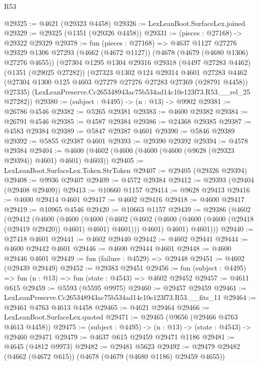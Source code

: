\begin{lexlean}{R53}
\begin{coremodule}
@29325 := @4621 (@29323 @4458)
@29326 := LexLeanBoot.SurfaceLex.joined
@29329 := @29325 (@1351 (@29326 @4458))
@29331 := (pieces : @27168) -> @29322 @29329
@29378 := fun (pieces : @27168) =>
  @4637
    @1127
    @27276
    @29329
    @1306
    @27293
    (@4662 (@4672 @1127))
    (@4678 (@4679 (@4680 @1306) @27276 @4655))
    (@27304
      @1295
      @1304
      @29316
      @29318
      (@4497 @27283 @4462)
      (@1351 (@29025 @27282))
      (@27323
        @1302
        @124
        @29314
        @4601
        @27283
        @4462
        (@27304 @1300 @125 @4603 @27279 @27276 @27283 @27369 (@28791 @4458))
        @27335)
      (LexLeanPreserve.Cc265348943ac75b534ad14c10e123f73.R53.__rel_25 @27282))
@29380 := (subject : @4495) -> (n : @13) -> @9902
@29381 := @26786 @4546
@29382 := @5265 @29381
@29383 := @4600 @29382
@29384 := @26791 @4546
@29385 := @4587 @29384
@29386 := @24368 @29385
@29387 := @4583 @29384
@29389 := @5847 @29387 @4601
@29390 := @5846 @29389
@29392 := @5855 @29387 @4601
@29393 := @29390 @29392
@29394 := @4578 @29384
@29404 := @4600 (@4602 (@4600 (@4600 (@4600 (@9628 (@29323 @29394)) @4601) @4601) @4603))
@29405 := LexLeanBoot.SurfaceLex.Token.StrToken
@29407 := @29405 (@29326 @29394)
@29408 := @9936 @29407
@29409 := @4572 @29384
@29412 := @29393 (@29404 (@29408 @29409))
@29413 := @10660 @1157
@29414 := @9628 @29413
@29416 := @4600 @29414 @4601
@29417 := @4602 @29416
@29418 := @4600 @29417
@29419 := @10965 @4546
@29420 := @10663 @1157
@29439 := @29386
    (@4602
      (@29412
        (@4600
          (@4600
            (@4600
              (@4602 (@4602 (@4600 (@4600 (@4600 (@29418 (@29419 @29420)) @4601) @4601) @4601)))
              @4601)
            @4601)
          @4601)))
@29440 := @27418 @4601
@29441 := @4602 @29440
@29442 := @4602 @29441
@29444 := @4600 @29442 @4601
@29446 := @4600 @29444 @4601
@29448 := @4600 @29446 @4601
@29449 := fun (failure : @4529) => @29448
@29451 := @4602 (@29439 @29449)
@29452 := @29383 @29451
@29456 := fun (subject : @4495) => fun (n : @13) => fun (state : @4543) => @4602 @29452
@29457 := @4611 @615
@29459 := @5593 (@5595 @9975)
@29460 := @29457 @29459
@29461 := LexLeanPreserve.Cc265348943ac75b534ad14c10e123f73.R53.__fits_11
@29464 := @29461 @4763 @4613 @4458
@29465 := @4621 @29464
@29466 := LexLeanBoot.SurfaceLex.quoted
@29471 := @29465 (@9656 (@29466 @4763 @4613 @4458))
@29475 := (subject : @4495) -> (n : @13) -> (state : @4543) -> @29460 @29471
@29479 := @4637 @615 @29459 @29471 @1186
@29481 := @4645 (@4812 @9973)
@29482 := @29481 @5623
@29492 := @29479 @29482 (@4662 (@4672 @615)) (@4678 (@4679 (@4680 @1186) @29459 @4655))

\end{coremodule}
\end{lexlean}
